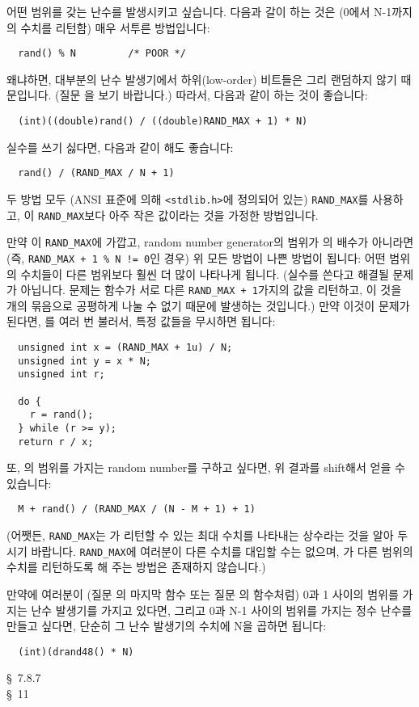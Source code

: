 \begin{faq}
	어떤 범위를 갖는 난수를 발생시키고 싶습니다.
\A
	다음과 갈이 하는 것은 (0에서 N-1까지의 수치를 리턴함) 매우 서투른
	방법입니다:
\begin{verbatim}
  rand() % N         /* POOR */
\end{verbatim}
	\noindent 왜냐하면, 대부분의 난수 발생기에서 하위(low-order) 비트들은
	그리 랜덤하지 않기 때문입니다.  (질문 을 보기 바랍니다.) 
        따라서, 다음과 같이 하는 것이 좋습니다:
\begin{verbatim}
  (int)((double)rand() / ((double)RAND_MAX + 1) * N)
\end{verbatim}
	\noindent 실수를 쓰기 싫다면, 다음과 같이 해도 좋습니다:
\begin{verbatim}
  rand() / (RAND_MAX / N + 1)
\end{verbatim}
	\noindent 두 방법 모두 (ANSI 표준에 의해 \verb+<stdlib.h>+에
        정의되어 있는) \verb+RAND_MAX+를 사용하고, 이
        \verb+RAND_MAX+보다 아주 작은 값이라는 것을 가정한 방법입니다.

        만약 이 \verb+RAND_MAX+에 가깝고, random number generator의
        범위가 의 배수가 아니라면 (즉, 
        \verb?RAND_MAX + 1 % N != 0?인
        경우) 위 모든 방법이 나쁜 방법이 됩니다: 어떤 범위의 수치들이 다른
        범위보다 훨씬 더 많이 나타나게 됩니다. (실수를 쓴다고 해결될 문제가
        아닙니다. 문제는  함수가 서로 다른
        \verb!RAND_MAX + 1!가지의 값을 리턴하고, 이 것을 개의 묶음으로
        공평하게 나눌 수 없기 때문에 발생하는 것입니다.)
        만약 이것이 문제가 된다면, 를 여러 번 불러서, 특정 값들을
        무시하면 됩니다:
\begin{verbatim}
  unsigned int x = (RAND_MAX + 1u) / N;
  unsigned int y = x * N;
  unsigned int r;

  do {
    r = rand();
  } while (r >= y);
  return r / x;
\end{verbatim}
	또, \TT{[M, N]}의 범위를 가지는 random number를 구하고 싶다면,
        위 결과를 shift해서 얻을 수 있습니다:
\begin{verbatim}
  M + rand() / (RAND_MAX / (N - M + 1) + 1)
\end{verbatim}
	(어쨋든, \verb+RAND_MAX+는 가 리턴할 수 있는 최대 수치를
	나타내는 상수라는 것을 알아 두시기 바랍니다.  \verb+RAND_MAX+에
        여러분이 다른 수치를 대입할 수는 없으며, 가 다른 범위의
        수치를 리턴하도록 해 주는 방법은 존재하지 않습니다.)

	만약에 여러분이 (질문 의 마지막  함수 또는
        질문 의  함수처럼) 0과 1 사이의 범위를 가지는
        난수 발생기를 가지고 있다면, 그리고 0과 N-1 사이의 범위를 가지는 정수
        난수를 만들고 싶다면, 단순히 그 난수 발생기의 수치에 N을 곱하면 됩니다:
\begin{verbatim}
  (int)(drand48() * N)
\end{verbatim}

\R
	\cite{kr2} \S\ 7.8.7  \\
	\cite{pcs} \S\ 11 
\end{faq}


